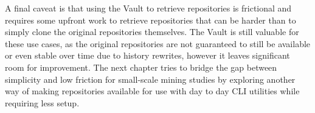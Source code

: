 A final caveat is that using the Vault to retrieve repositories is frictional
and requires some upfront work to retrieve repositories that can be harder than
to simply clone the original repositories themselves. The Vault is still
valuable for these use cases, as the original repositories are not guaranteed to
still be available or even stable over time due to history rewrites, however it
leaves significant room for improvement.  The next chapter tries to bridge the
gap between simplicity and low friction for small-scale mining studies by
exploring another way of making repositories available for use with day to day
CLI utilities while requiring less setup.


